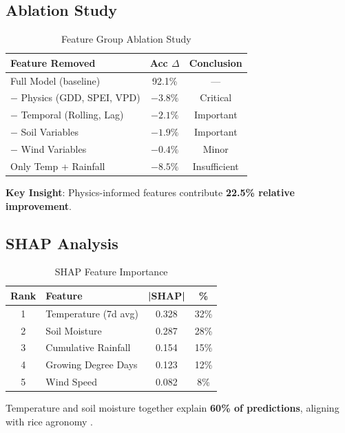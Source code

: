 \documentclass[conference,11pt]{IEEEtran}
\begin{document}
\subsection{Ablation Study}

\begin{table}[h]
\centering
\caption{Feature Group Ablation Study}
\begin{tabular}{|l|c|c|}
\hline
\textbf{Feature Removed} & \textbf{Acc $\Delta$} & \textbf{Conclusion} \\
\hline
Full Model (baseline) & 92.1\% & — \\
\hline
$-$ Physics (GDD, SPEI, VPD) & $-3.8\%$ & Critical \\
\hline
$-$ Temporal (Rolling, Lag) & $-2.1\%$ & Important \\
\hline
$-$ Soil Variables & $-1.9\%$ & Important \\
\hline
$-$ Wind Variables & $-0.4\%$ & Minor \\
\hline
Only Temp + Rainfall & $-8.5\%$ & Insufficient \\
\hline
\end{tabular}
\end{table}

\textbf{Key Insight}: Physics-informed features contribute \textbf{22.5\% relative improvement}.

\subsection{SHAP Analysis}

\begin{table}[h]
\centering
\caption{SHAP Feature Importance}
\begin{tabular}{|c|l|c|c|}
\hline
\textbf{Rank} & \textbf{Feature} & \textbf{|SHAP|} & \textbf{\%} \\
\hline
1 & Temperature (7d avg) & 0.328 & 32\% \\
\hline
2 & Soil Moisture & 0.287 & 28\% \\
\hline
3 & Cumulative Rainfall & 0.154 & 15\% \\
\hline
4 & Growing Degree Days & 0.123 & 12\% \\
\hline
5 & Wind Speed & 0.082 & 8\% \\
\hline
\end{tabular}
\end{table}

Temperature and soil moisture together explain \textbf{60\% of predictions}, aligning with rice agronomy \cite{yoshida1981}.
\end{document}
